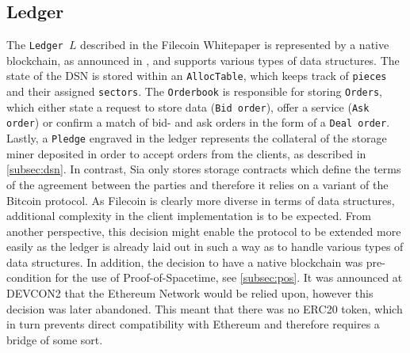 \documentclass[conference]{IEEEtran}
\begin{document}
\subsection{Ledger}
\label{subsec:ledger}
The \texttt{Ledger $L$} described in the Filecoin Whitepaper is represented by a native blockchain, as announced in \cite{filecoin-investor-faq}, and supports various types of data structures.
The state of the DSN is stored within an \texttt{AllocTable}, which keeps track of \texttt{pieces} and their assigned \texttt{sectors}.
The \texttt{Orderbook} is responsible for storing \texttt{Orders}, which either state a request to store data (\texttt{Bid order}), offer a service (\texttt{Ask order}) or confirm a match of bid- and ask orders in the form of a \texttt{Deal order}.
Lastly, a \texttt{Pledge} engraved in the ledger represents the collateral of the storage miner deposited in order to accept orders from the clients, as described in \ref{subsec:dsn}.
In contrast, Sia only stores storage contracts which define the terms of the agreement between the parties and therefore it relies on a variant of the Bitcoin protocol\cite{bitcoin}.
As Filecoin is clearly more diverse in terms of data structures, additional complexity in the client implementation is to be expected.
From another perspective, this decision might enable the protocol to be extended more easily as the ledger is already laid out in such a way as to handle various types of data structures.
In addition, the decision to have a native blockchain was pre-condition for the use of Proof-of-Spacetime, see \ref{subsec:pos}.
It was announced at DEVCON2 \cite{devcon2} that the Ethereum Network\cite{ethereum} would be relied upon, however this decision was later abandoned. 
This meant that there was no ERC20 token, \cite{erc20} which in turn prevents direct compatibility with Ethereum and therefore requires a bridge of some sort.

\end{document}
